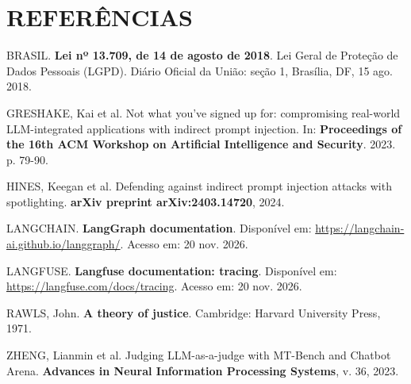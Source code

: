\documentclass[12pt,a4paper]{article}
\begin{document}
\section*{REFERÊNCIAS}
\begingroup\singlespacing\setlength{\parindent}{0pt}\setlength{\parskip}{10pt}
BRASIL. \textbf{Lei nº 13.709, de 14 de agosto de 2018}. Lei Geral de Proteção de Dados Pessoais (LGPD). Diário Oficial da União: seção 1, Brasília, DF, 15 ago. 2018.

GRESHAKE, Kai et al. Not what you've signed up for: compromising real-world LLM-integrated applications with indirect prompt injection. In: \textbf{Proceedings of the 16th ACM Workshop on Artificial Intelligence and Security}. 2023. p. 79-90.

HINES, Keegan et al. Defending against indirect prompt injection attacks with spotlighting. \textbf{arXiv preprint arXiv:2403.14720}, 2024.

LANGCHAIN. \textbf{LangGraph documentation}. Disponível em: \url{https://langchain-ai.github.io/langgraph/}. Acesso em: 20 nov. 2026.

LANGFUSE. \textbf{Langfuse documentation: tracing}. Disponível em: \url{https://langfuse.com/docs/tracing}. Acesso em: 20 nov. 2026.

RAWLS, John. \textbf{A theory of justice}. Cambridge: Harvard University Press, 1971.

ZHENG, Lianmin et al. Judging LLM-as-a-judge with MT-Bench and Chatbot Arena. \textbf{Advances in Neural Information Processing Systems}, v. 36, 2023.

\endgroup
\end{document}
